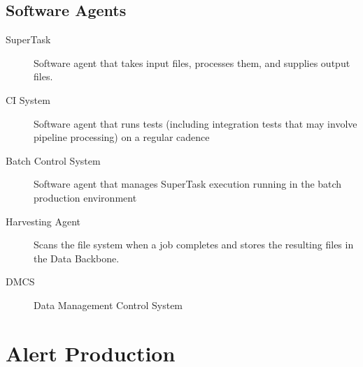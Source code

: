 \documentclass[DM,toc,lsstdraft]{lsstdoc}
\begin{document}
\subsection{Software Agents}

\begin{description}
\item[SuperTask] Software agent that takes input files, processes them, and supplies output files.
\item[CI System] Software agent that runs tests (including integration tests that may involve pipeline processing) on a regular cadence
\item[Batch Control System] Software agent that manages SuperTask execution running in the batch production environment
\item[Harvesting Agent] Scans the file system when a job completes and stores the resulting files in the Data Backbone.
\item[DMCS] Data Management Control System
\end{description}

\section{Alert Production}
\end{document}
